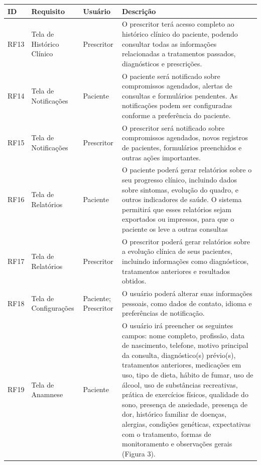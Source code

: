 \href{}{}\documentclass[12pt,portuguese,oneside]{article}
\begin{document}
\newpage

\begin{table}[H]
\centering
{}
\begin{tabularx}{\textwidth}{|>{\raggedright\arraybackslash}p{1cm}|>{\raggedright\arraybackslash}p{3cm}|>{\raggedright\arraybackslash}p{2cm}|>{\raggedright\arraybackslash}X|}
\hline
\rowcolor{gray!20}
\textbf{ID} & \textbf{Requisito} & \textbf{Usuário} & \textbf{Descrição}\\
\hline
RF13 & Tela de Histórico Clínico & Prescritor & O prescritor terá acesso completo ao histórico clínico do paciente, podendo consultar todas as informações relacionadas a tratamentos passados, diagnósticos e prescrições.\\
\hline
RF14 & Tela de Notificações & Paciente & O paciente será notificado sobre compromissos agendados, alertas de consultas e formulários pendentes. As notificações podem ser configuradas conforme a preferência do paciente.\\
\hline
RF15 & Tela de Notificações & Prescritor & O prescritor será notificado sobre compromissos agendados, novos registros de pacientes, formulários preenchidos e outras ações importantes.\\
\hline
RF16 & Tela de Relatórios & Paciente & O paciente poderá gerar relatórios sobre o seu progresso clínico, incluindo dados sobre sintomas, evolução do quadro, e outros indicadores de saúde. O sistema permitirá que esses relatórios sejam exportados ou impressos, para que o paciente os leve a outras consultas\\
\hline
RF17 & Tela de Relatórios & Prescritor & O prescritor poderá gerar relatórios sobre a evolução clínica de seus pacientes, incluindo informações como diagnósticos, tratamentos anteriores e resultados obtidos.\\
\hline
RF18 & Tela de Configurações & Paciente; Prescritor & O usuário poderá alterar suas informações pessoais, como dados de contato, idioma e preferências de notificação.\\
\hline
RF19 & Tela de Anamnese & Paciente & O usuário irá preencher os seguintes campos: nome completo, profissão, data de nascimento, telefone, motivo principal da consulta, diagnóstico(s) prévio(s), tratamentos anteriores, medicações em uso, tipo de dieta, hábito de fumar, uso de álcool, uso de substâncias recreativas, prática de exercícios físicos, qualidade do sono, presença de ansiedade, presença de dor, histórico familiar de doenças, alergias, condições genéticas, expectativas com o tratamento, formas de monitoramento e observações gerais (Figura 3).\\
\hline
\end{tabularx}
\end{table}
\end{document}
